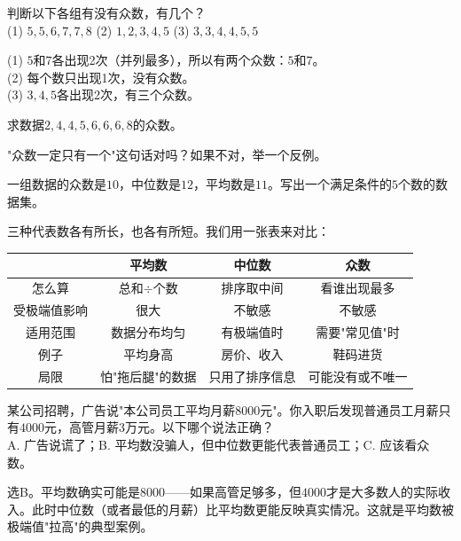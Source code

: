 
\begin{example}
判断以下各组有没有众数，有几个？\\
(1) $5,5,6,7,7,8$ \qquad (2) $1,2,3,4,5$ \qquad (3) $3,3,4,4,5,5$
\end{example}
\begin{solution}
(1) $5$和$7$各出现2次（并列最多），所以有两个众数：$5$和$7$。\\
(2) 每个数只出现1次，没有众数。\\
(3) $3,4,5$各出现2次，有三个众数。
\end{solution}

\begin{exercise}
\item 求数据$2,4,4,5,6,6,6,8$的众数。
\item "众数一定只有一个"这句话对吗？如果不对，举一个反例。
\item 一组数据的众数是$10$，中位数是$12$，平均数是$11$。写出一个满足条件的$5$个数的数据集。
\end{exercise}


三种代表数各有所长，也各有所短。我们用一张表来对比：

\begin{center}
\begin{tabular}{c|c|c|c}
 & 平均数 & 中位数 & 众数\\\hline
怎么算 & 总和$\div$个数 & 排序取中间 & 看谁出现最多\\
受极端值影响 & 很大 & 不敏感 & 不敏感\\
适用范围 & 数据分布均匀 & 有极端值时 & 需要"常见值"时\\
例子 & 平均身高 & 房价、收入 & 鞋码进货\\
局限 & 怕"拖后腿"的数据 & 只用了排序信息 & 可能没有或不唯一
\end{tabular}
\end{center}

\begin{example}
某公司招聘，广告说"本公司员工平均月薪$8000$元"。你入职后发现普通员工月薪只有$4000$元，高管月薪$3$万元。以下哪个说法正确？\\
A. 广告说谎了；B. 平均数没骗人，但中位数更能代表普通员工；C. 应该看众数。
\end{example}
\begin{solution}
选B。平均数确实可能是$8000$——如果高管足够多，但$4000$才是大多数人的实际收入。此时中位数（或者最低的月薪）比平均数更能反映真实情况。这就是平均数被极端值"拉高"的典型案例。
\end{solution}

